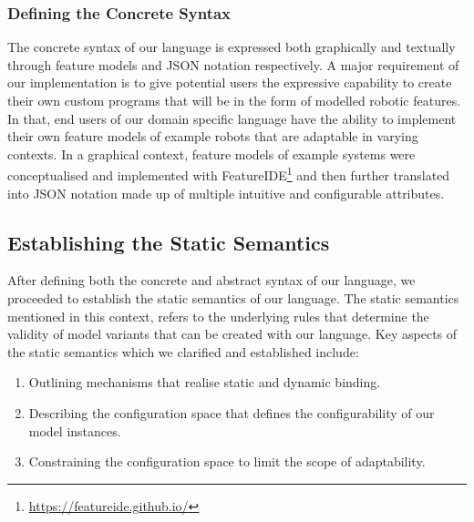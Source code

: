 \documentclass[conference]{IEEEtran}
\newcommand{\foot}[1]{\footnote{\url{#1}}}
\begin{document}
\subsubsection{Defining the Concrete Syntax}
The concrete syntax of our language is expressed both graphically and textually through feature models and JSON notation respectively. A major requirement of our implementation is to give potential users the expressive capability to create their own custom programs that will be in the form of modelled robotic features. In that, end users of our domain specific language have the ability to implement their own feature models of example robots that are adaptable in varying contexts. In a graphical context, feature models of example systems were conceptualised and implemented with FeatureIDE\foot{https://featureide.github.io/} and then further translated into JSON notation made up of multiple intuitive and configurable attributes.

\subsection{Establishing the Static Semantics}
After defining both the concrete and abstract syntax of our language, we proceeded to establish the static semantics of our language. The static semantics mentioned in this context, refers to the underlying rules that determine the validity of model variants that can be created with our language. Key aspects of the static semantics which we clarified and established include:
\begin{enumerate}
    \item Outlining mechanisms that realise static and dynamic binding.
    \item Describing the configuration space that defines the configurability of our model instances.
    \item Constraining the configuration space to limit the scope of adaptability.
\end{enumerate}
\end{document}
